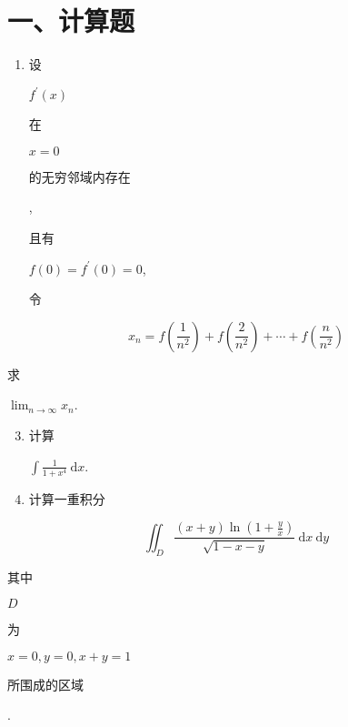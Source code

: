 \documentclass[10pt]{article}
\begin{document}
\section{一、计算题}
\begin{enumerate}
  \item \begin{CJK}{UTF8}{mj}设\end{CJK} $f^{\prime}(x)$ \begin{CJK}{UTF8}{mj}在\end{CJK} $x=0$ \begin{CJK}{UTF8}{mj}的无穷邻域内存在\end{CJK}, \begin{CJK}{UTF8}{mj}且有\end{CJK} $f(0)=f^{\prime}(0)=0$, \begin{CJK}{UTF8}{mj}令\end{CJK}
\end{enumerate}
$$
x_{n}=f\left(\frac{1}{n^{2}}\right)+f\left(\frac{2}{n^{2}}\right)+\cdots+f\left(\frac{n}{n^{2}}\right)
$$
\begin{CJK}{UTF8}{mj}求\end{CJK} $\lim _{n \rightarrow \infty} x_{n}$.

\begin{enumerate}
  \setcounter{enumi}{2}
  \item \begin{CJK}{UTF8}{mj}计算\end{CJK} $\int \frac{1}{1+x^{4}} \mathrm{~d} x$.

  \item \begin{CJK}{UTF8}{mj}计算一重积分\end{CJK}

\end{enumerate}
$$
\iint_{D} \frac{(x+y) \ln \left(1+\frac{y}{x}\right)}{\sqrt{1-x-y}} \mathrm{~d} x \mathrm{~d} y
$$
\begin{CJK}{UTF8}{mj}其中\end{CJK} $D$ \begin{CJK}{UTF8}{mj}为\end{CJK} $x=0, y=0, x+y=1$ \begin{CJK}{UTF8}{mj}所围成的区域\end{CJK}.
\end{document}
